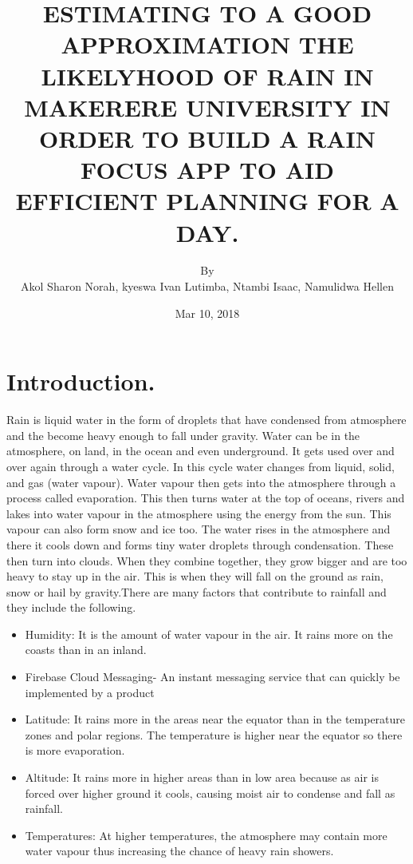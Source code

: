 \documentclass{article}
\title{ESTIMATING TO A GOOD APPROXIMATION THE LIKELYHOOD OF RAIN IN MAKERERE UNIVERSITY IN ORDER TO BUILD A RAIN FOCUS APP TO AID EFFICIENT PLANNING FOR A DAY.
}
\author{By\\Akol Sharon Norah, kyeswa Ivan Lutimba, Ntambi Isaac, Namulidwa Hellen}
\date{Mar 10, 2018}
\begin{document}
\maketitle

\newpage

\section{Introduction.}
Rain is liquid water in the form of droplets that have condensed from atmosphere and the become heavy enough to fall under gravity.
Water can be in the atmosphere, on land, in the ocean and even underground. It gets used over and over again through a water cycle. In this cycle water changes from liquid, solid, and gas (water vapour). Water vapour then gets into the atmosphere through a process called evaporation. This then turns water at the top of oceans, rivers and lakes into water vapour in the atmosphere using the energy from the sun. This vapour can also form snow and ice too. The water rises in the atmosphere and there it cools down and forms tiny water droplets through condensation. These then turn into clouds. When they combine together, they grow bigger and are too heavy to stay up in the air. This is when they will fall on the ground as rain, snow or hail by gravity.There are many factors that contribute to rainfall and they include the following.


\begin{itemize}
    \item Humidity: It is the amount of water vapour in the air. It rains more on the coasts than in an inland.

    \item Firebase Cloud Messaging- An instant messaging service that can quickly be implemented by a product
    \item Latitude:  It rains more in the areas near the equator than in the temperature zones and polar regions. The temperature is higher near the equator so there is more evaporation.
    \item Altitude: It rains more in higher areas than in low area because as air is forced over higher ground it cools, causing moist air to condense and fall as rainfall.
    \item Temperatures: At higher temperatures, the atmosphere may contain more water vapour thus increasing the chance of heavy rain showers.

    \end{itemize}
\end{document}
